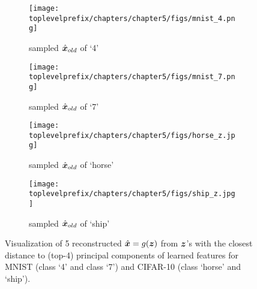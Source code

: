 \documentclass[\toplevelprefix/book-main.tex]{subfiles}
\begin{document}
\begin{figure}[t]
    \begin{subfigure}[t]{0.20\textwidth}
        \centering
        \texttt{[image: \\toplevelprefix/chapters/chapter5/figs/mnist\_4.png]}
        \caption{sampled $\hat{\bm{x}}_{old}$ of `4'}
    \end{subfigure}
    \hfill
    \begin{subfigure}[t]{0.20\textwidth}
        \centering
        \texttt{[image: \\toplevelprefix/chapters/chapter5/figs/mnist\_7.png]}
        \caption{sampled $\hat{\bm{x}}_{old}$ of `7'}
    \end{subfigure}
    \hfill
    \begin{subfigure}[t]{0.20\textwidth}
        \centering
        \texttt{[image: \\toplevelprefix/chapters/chapter5/figs/horse\_z.jpg]}
        \caption{sampled $\hat{\bm{x}}_{old}$ of `horse'}
    \end{subfigure}
    \hfill
    \begin{subfigure}[t]{0.20\textwidth}
        \centering
        \texttt{[image: \\toplevelprefix/chapters/chapter5/figs/ship\_z.jpg]}
        \caption{sampled $\hat{\bm{x}}_{old}$ of `ship'}
    \end{subfigure}
    \caption{\small Visualization of 5 reconstructed $\hat {\bm{x}}=g(\bm{z})$ from $\bm{z}$'s with the closest distance to (top-4) principal components of learned features for {MNIST} (class ‘4’ and class ‘7’) and {CIFAR-10} (class ‘horse’ and  ‘ship’).}
    \label{fig:pca_sampling_main}
\end{figure}

\end{document}
